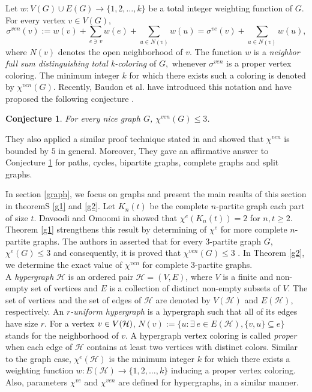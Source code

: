 \documentclass[12pt,a4paper]{article}
\newtheorem{conjecture}{\bf Conjecture}
\begin{document}
Let $w:V(G)\cup E(G)\rightarrow\{1,2,\ldots, k\} $ be a total integer weighting function of $G$. For every vertex $v \in V(G)$,
\begin{equation*}
\sigma^{ven}(v) :=w(v)+ \sum_{e\ni v}w(e)+ \sum_{u\in N(v)}w(u)=\sigma^{ve}(v)+\sum_{u\in N(v)} w(u),
\end{equation*}
where $N(v)$ denotes the open neighborhood of $v$. The function $w$ is  a \textit{neighbor full sum distinguishing
	total k-coloring} of $ G, $ whenever $\sigma^{ven}$ is a proper vertex coloring. The minimum integer $k$ for which there exists
such a coloring is denoted by $  \chi^{ven}(G)$.
Recently, Baudon et al. have introduced this notation  and  have proposed  the following conjecture \cite{B}.
\begin{conjecture}\label{ven conj}{\em\cite{B}}
	For every  nice graph $ G $, $  \chi^{ven}(G)\leq 3 $.
\end{conjecture}
They also applied a similar proof technique stated in \cite{KKP} and showed  that $\chi^{ven}$ is bounded by $ 5 $ in general. Moreover, They gave an affirmative answer to Conjecture \ref{ven conj} for paths, cycles, bipartite graphs,  complete graphs and split graphs.

In section \ref{graph}, we  focus on graphs and present the main results of this section in   theoremS \ref{g1} and \ref{g2}.
Let $ K_n(t) $ be the complete $ n$-partite graph each part of size $ t $.  Davoodi and Omoomi in \cite{DO} showed that  $ \chi^{e}(K_n(t)) =2$ for $n,t \geq 2$.  Theorem \ref{g1} strengthens this result by determining  of $ \chi^{e}$ for more complete $ n$-partite graphs.
The authors in \cite{KLT} asserted that for every $3$-partite graph $G$, $ \chi^{e}(G)\leq 3$ and consequently, it is proved that $ \chi^{ven}(G)\leq 3$ \cite{B}.  In Theorem \ref{g2}, we determine the exact value of $\chi^{ven}$ for complete $3$-partite graphs.
\\

A {\it hypergraph} $\mathcal{H}$ is an ordered pair $\mathcal{H}=(V,E)$, where $V$ is a finite and non-empty set of vertices and $E$ is a collection of distinct non-empty  subsets of $V$.  The set of vertices and the set of edges of $\mathcal{H}$ are denoted by  $V(\mathcal{H})$ and $E(\mathcal{H})$, respectively.
An {\it $r$-uniform
	hypergraph} is a hypergraph such that all of its edges have size $r$. For a vertex  $v \in V(\cal{H})$, $N(v):=\{u: \exists\ e \in E(\mathcal{H}), \{v,u\}\subseteq e\}$ stands for the neighborhood of $v$.
A hypergraph vertex coloring is called \textit{proper} when each edge of $\mathcal{H}$ contains at least two vertices with
distinct colors.
Similar to the graph case,  $  \chi^{e}(\mathcal{H})$ is the minimum integer $ k $
for which there exists a weighting function $ w:E(\mathcal{H})\rightarrow\{1,2,\ldots, k\}$  inducing a proper vertex coloring. Also,  parameters $  \chi^{ve}$ and $  \chi^{ven}$ are defined for hypergraphs, in a similar manner.
\end{document}
